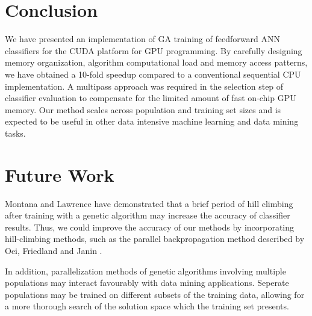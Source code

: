 \documentclass[letterpaper]{jpconf}       %
\begin{document}
\section{Conclusion} \label{concl}
We have presented an implementation of GA training of feedforward ANN classifiers for the CUDA platform for GPU programming. By carefully designing memory organization, algorithm computational load and memory access patterns, we have obtained a 10-fold speedup compared to a conventional sequential CPU implementation. A multipass approach was required in the selection step of classifier evaluation to compensate for the limited amount of fast on-chip GPU memory. Our method scales across population and training set sizes and is expected to be useful in other data intensive machine learning and data mining tasks.

\section{Future Work} \label{future}
Montana and Lawrence \cite{GA-ANN} have demonstrated that a brief period of hill climbing after training with a genetic algorithm may increase the accuracy of classifier results. Thus, we could improve the accuracy of our methods by incorporating hill-climbing methods, such as the parallel backpropagation method described by Oei, Friedland and Janin \cite{backprop}.

In addition, parallelization methods of genetic algorithms involving multiple populations \cite{Alba1999} may interact favourably with data mining applications.  Seperate populations may be trained on different subsets of the training data, allowing for a more thorough search of the solution space which the training set presents.\\



\end{document}
